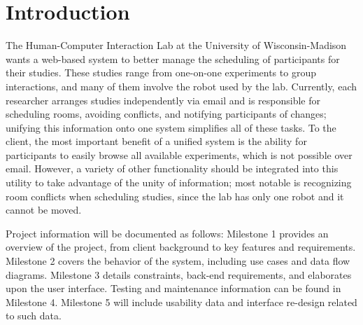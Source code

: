 \section{Introduction}
The Human-Computer Interaction Lab at the University of Wisconsin-Madison wants a web-based system to better manage the scheduling of participants for their studies.  These studies range from one-on-one experiments to group interactions, and many of them involve the robot used by the lab.  Currently, each researcher arranges studies independently via email and is responsible for scheduling rooms, avoiding conflicts, and notifying participants of changes; unifying this information onto one system simplifies all of these tasks.  To the client, the most important benefit of a unified system is the ability for participants to easily browse all available experiments, which is not possible over email.  However, a variety of other functionality should be integrated into this utility to take advantage of the unity of information; most notable is recognizing room conflicts when scheduling studies, since the lab has only one robot and it cannot be moved.\cite{website:HCI}

Project information will be documented as follows:  Milestone 1 provides an overview of the project, from client background to key features and requirements.  Milestone 2 covers the behavior of the system, including use cases and data flow diagrams.  Milestone 3 details constraints, back-end requirements, and elaborates upon the user interface.  Testing and maintenance information can be found in Milestone 4.  Milestone 5 will include usability data and interface re-design related to such data.